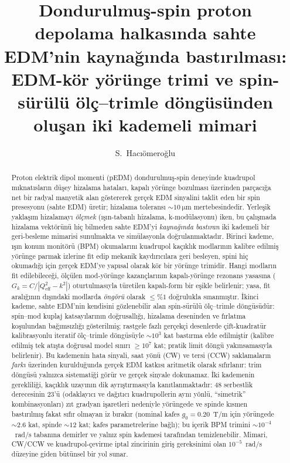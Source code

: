 \documentclass[preprint,12pt]{elsarticle}
\newcommand{\todo}[1]{{\color{red}\textbf{(YAPILACAK: #1)}}}
\begin{document}
\begin{frontmatter}

\title{Dondurulmuş-spin proton depolama halkasında sahte EDM'nin
kaynağında bastırılması: EDM-kör yörünge trimi ve spin-sürülü
ölç--trimle döngüsünden oluşan iki kademeli mimari}

\author[inst1]{S.~Hac\i\"omero\u{g}lu}

\address[inst1]{\todo{kurum bilgisi}}

\begin{abstract}
Proton elektrik dipol momenti (pEDM) dondurulmuş-spin deneyinde
kuadrupol mıknatısların düşey hizalama hataları, kapalı yörünge
bozulması üzerinden parçacığa net bir radyal manyetik alan göstererek
gerçek EDM sinyalini taklit eden bir spin presesyonu (sahte EDM)
üretir; hizalama toleransı $\sim\SI{10}{\micro\meter}$ mertebesindedir.
Yerleşik yaklaşım hizalamayı \emph{ölçmek} (ışın-tabanlı hizalama,
k-modülasyonu) iken, bu çalışmada hizalama vektörünü hiç bilmeden
sahte EDM'yi \emph{kaynağında bastıran} iki kademeli bir geri-besleme
mimarisi sunulmakta ve simülasyonla doğrulanmaktadır. Birinci kademe,
ışın konum monitörü (BPM) okumalarını kuadrupol kaçıklık modlarının
kalibre edilmiş yörünge parmak izlerine fit edip mekanik kaydırıcılara
geri besleyen, spini hiç okumadığı için gerçek EDM'ye yapısal olarak
kör bir yörünge trimidir. Hangi modların fit edilebileceği, ölçülen
mod-yörünge kazançlarının kapalı-yörünge rezonans yasasına
($G_k=C/|Q_\mathrm{eff}^2-k^2|$) oturtulmasıyla türetilen kapalı-form
bir eşikle belirlenir; yasa, fit aralığının dışındaki modlarda
\emph{öngörü} olarak $\le\%1$ doğrulukla sınanmıştır. İkinci kademe,
sahte EDM'nin kendisini gözlenebilir alan spin-sürülü ölç--trimle
döngüsüdür: spin--mod kuplaj katsayılarının doğrusallığı, hizalama
deseninden ve fırlatma koşulundan bağımsızlığı gösterilmiş; rastgele
fazlı gerçekçi desenlerde çift-kuadratür kalibrasyonlu iteratif
ölç--trimle döngüsüyle $\sim10^{3}$ kat bastırma elde edilmiştir
(kalibre edilmiş tek atışta doğrusal model sınırı $\ge10^{7}$ kat;
pratik limit döngü yakınsamasıyla belirlenir). Bu kademenin hata sinyali, saat yönü (CW) ve
tersi (CCW) saklamaların \emph{farkı} üzerinden kurulduğunda gerçek
EDM katkısı aritmetik olarak sıfırlanır: trim döngüsü yalnızca
sistematiği görür ve gerçek sinyale dokunamaz. İki kademenin
gerekliliği, kaçıklık uzayının dik ayrıştırmasıyla kanıtlanmaktadır:
48 serbestlik derecesinin 23'ü (odaklayıcı ve dağıtıcı kuadrupollerin
aynı yönlü, ``simetrik'' kombinasyonları) zıt gradyan işaretleri
nedeniyle yörüngede ve spinde kısmen bastırılmış
fakat sıfır olmayan iz bırakır (nominal kafes $g_0=0.20$~T/m için
yörüngede $\sim2.6$ kat, spinde $\sim12$ kat; kafes parametrelerine
bağlı); bu içerik BPM trimini
$\sim10^{-4}$~rad/s tabanına demirler ve yalnız spin kademesi
tarafından temizlenebilir. Mimari, CW/CCW ve kuadrupol-çevirme iptal
zincirinin giriş gereksinimi olan $10^{-5}$~rad/s düzeyine giden
bütünsel bir yol sunar.
\end{abstract}


\end{frontmatter}
\end{document}
